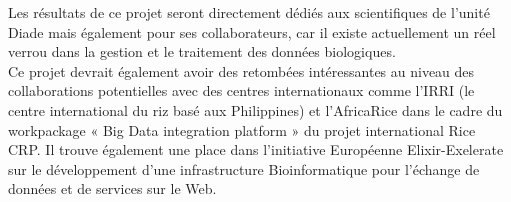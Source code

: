 Les résultats de ce projet seront directement dédiés aux scientifiques de l’unité Diade mais également pour ses collaborateurs, car il existe actuellement un réel verrou dans la gestion et le traitement des données biologiques.\\

Ce projet devrait également avoir des retombées intéressantes au niveau des collaborations potentielles avec des centres internationaux comme l’IRRI (le centre international du riz basé aux Philippines) et l'AfricaRice dans le cadre du workpackage « Big Data integration platform » du projet international Rice CRP. Il trouve également une place dans l'initiative Européenne Elixir-Exelerate sur le développement d'une infrastructure Bioinformatique pour l'échange de données et de services sur le Web.  



